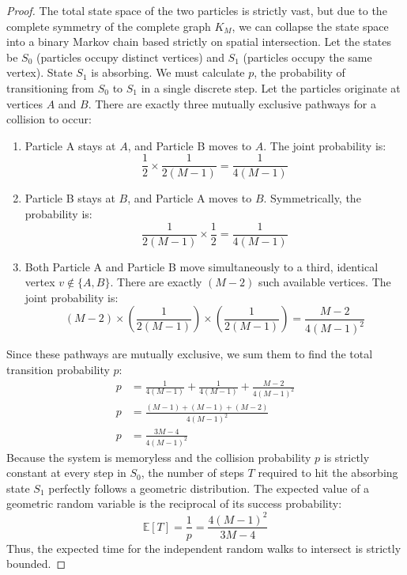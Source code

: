 \documentclass[11pt, a4paper]{article}
\theoremstyle{definition}
\theoremstyle{plain}
\begin{document}
\begin{proof}
The total state space of the two particles is strictly vast, but due to the complete symmetry of the complete graph $K_M$, we can collapse the state space into a binary Markov chain based strictly on spatial intersection. Let the states be $S_0$ (particles occupy distinct vertices) and $S_1$ (particles occupy the same vertex). State $S_1$ is absorbing.
We must calculate $p$, the probability of transitioning from $S_0$ to $S_1$ in a single discrete step. Let the particles originate at vertices $A$ and $B$. There are exactly three mutually exclusive pathways for a collision to occur:
\begin{enumerate}
    \item Particle A stays at $A$, and Particle B moves to $A$. The joint probability is:
    \[ \frac{1}{2} \times \frac{1}{2(M-1)} = \frac{1}{4(M-1)} \]
    \item Particle B stays at $B$, and Particle A moves to $B$. Symmetrically, the probability is:
    \[ \frac{1}{2(M-1)} \times \frac{1}{2} = \frac{1}{4(M-1)} \]
    \item Both Particle A and Particle B move simultaneously to a third, identical vertex $v \notin \{A, B\}$. There are exactly $(M - 2)$ such available vertices. The joint probability is:
    \[ (M - 2) \times \left( \frac{1}{2(M-1)} \right) \times \left( \frac{1}{2(M-1)} \right) = \frac{M-2}{4(M-1)^2} \]
\end{enumerate}
Since these pathways are mutually exclusive, we sum them to find the total transition probability $p$:
\begin{align*}
p &= \frac{1}{4(M-1)} + \frac{1}{4(M-1)} + \frac{M-2}{4(M-1)^2} \\
p &= \frac{(M-1) + (M-1) + (M-2)}{4(M-1)^2} \\
p &= \frac{3M - 4}{4(M-1)^2}
\end{align*}
Because the system is memoryless and the collision probability $p$ is strictly constant at every step in $S_0$, the number of steps $T$ required to hit the absorbing state $S_1$ perfectly follows a geometric distribution.
The expected value of a geometric random variable is the reciprocal of its success probability:
\[
\mathbb{E}[T] = \frac{1}{p} = \frac{4(M-1)^2}{3M - 4}
\]
Thus, the expected time for the independent random walks to intersect is strictly bounded.
\end{proof}
\end{document}
